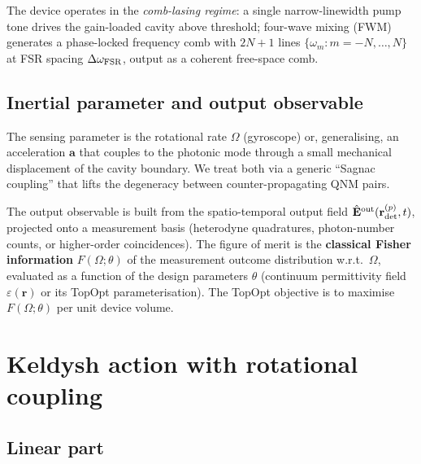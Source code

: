 \documentclass[11pt]{article}
\begin{document}
The device operates in the \emph{comb-lasing regime}: a single
narrow-linewidth pump tone drives the gain-loaded cavity above
threshold; four-wave mixing (FWM) generates a phase-locked frequency
comb with $2N+1$ lines $\{\omega_m: m=-N,\ldots,N\}$ at FSR spacing
$\Delta\omega_{\rm FSR}$, output as a coherent free-space comb.

\subsection{Inertial parameter and output observable}

The sensing parameter is the rotational rate $\Omega$ (gyroscope) or,
generalising, an acceleration $\mathbf{a}$ that couples to the
photonic mode through a small mechanical displacement of the cavity
boundary.  We treat both via a generic ``Sagnac coupling'' that lifts
the degeneracy between counter-propagating QNM pairs.

The output observable is built from the spatio-temporal output field
$\hat{\mathbf{E}}^{\rm out}(\mathbf{r}_{\rm det}^{(p)},t)$, projected
onto a measurement basis (heterodyne quadratures, photon-number
counts, or higher-order coincidences).  The figure of merit is the
\textbf{classical Fisher information}
$F(\Omega; \theta)$ of the measurement outcome distribution
w.r.t.\ $\Omega$, evaluated as a function of the design parameters
$\theta$ (continuum permittivity field $\varepsilon(\mathbf{r})$ or its
TopOpt parameterisation).  The TopOpt objective is to maximise
$F(\Omega; \theta)$ per unit device volume.

\section{Keldysh action with rotational coupling}
\label{sec:action}

\subsection{Linear part}
\end{document}
